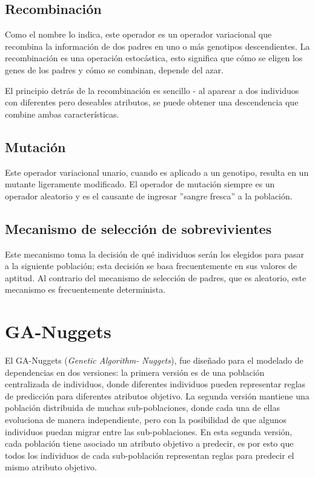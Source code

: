 \subsection{Recombinación}

Como el nombre lo indica, este operador es un operador variacional que recombina la información de dos padres en uno o más genotipos descendientes. La recombinación es una operación estocástica, esto significa que cómo se eligen los genes de los padres y cómo se combinan, depende del azar.

El principio detrás de la recombinación es sencillo - al aparear a dos individuos con diferentes pero deseables atributos, se puede obtener una descendencia que combine ambas características. 

\subsection{Mutación}

Este operador variacional unario, cuando es aplicado a un genotipo, resulta en un mutante ligeramente modificado. El operador de mutación siempre es un operador aleatorio y es el causante de ingresar ''sangre fresca'' a la población.

\subsection{Mecanismo de selección de sobrevivientes}

Este mecanismo toma la decisión de qué individuos serán los elegidos para pasar a la siguiente población; esta decisión se basa frecuentemente en sus valores de aptitud. Al contrario del mecanismo de selección de padres, que es aleatorio, este mecanismo es frecuentemente determinista. 

\section{GA-Nuggets}

El GA-Nuggets (\textit{Genetic Algorithm- Nuggets}), fue diseñado para el modelado de dependencias en dos versiones: la primera versión es de una población centralizada de individuos, donde diferentes individuos pueden representar reglas de predicción para diferentes atributos objetivo. La segunda versión mantiene una población distribuida de muchas sub-poblaciones, donde cada una de ellas evoluciona de manera independiente, pero con la posibilidad de que algunos individuos puedan migrar entre las sub-poblaciones. En esta segunda versión, cada población tiene asociado un atributo objetivo a predecir, es por esto que todos los individuos de cada sub-población representan reglas para predecir el mismo atributo objetivo.


